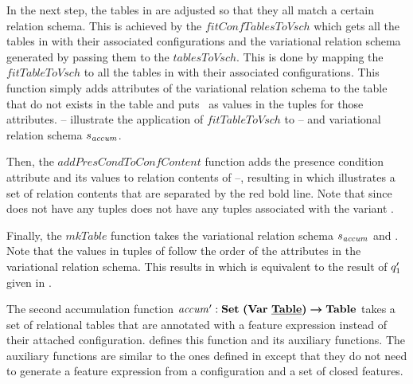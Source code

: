 \begin{example}
%
In the next step, the tables in  are adjusted so that they all match a certain
relation schema. This is achieved by the $\mathit{fitConfTablesToVsch}$ which gets all the 
tables in  with their associated configurations and the variational relation
schema generated by passing them to the $\mathit{tablesToVsch}$. This is done by
mapping the  $\mathit{fitTableToVsch}$ to all the tables in 
 with their associated configurations. This function simply adds
 attributes of the variational relation schema to the table that do not exists in the table 
 and puts \nul\ as values in the tuples for those attributes. 
%
-- illustrate the application of 
$\mathit{fitTableToVsch}$ to -- and variational relation 
schema $\vRelSch_{\mathit{accum}}$.
%



%
Then, the $\mathit{addPresCondToConfContent}$ 
function adds the presence condition attribute and its values 
to relation contents of --, resulting in  which illustrates a set of 
relation contents that are separated by the red bold line. Note that since 
does not have any tuples  does not have any tuples associated with
the variant \setDef \vThree.
%

%
Finally, the $\mathit{mkTable}$ function takes the variational relation schema $\vRelSch_{\mathit{accum}}$
and . Note that the values in tuples of  follow the order of the
attributes in the variational relation schema. This results in  which is equivalent to
the result of $\VVal \vQ_1$ given in .
%

\end{example}

The second accumulation function
 $\VVal {\mathit{accum}} :  \settype {\bm{(}\vartype \pTabSet\bm{)}} \totype \tabletype$ 
 takes a set of relational tables that are annotated with
a feature expression instead of their attached configuration.  defines
this function and its auxiliary functions. The auxiliary functions are similar to the ones
defined in  except that they do not need to generate a feature expression
from a configuration and a set of closed features.
%



